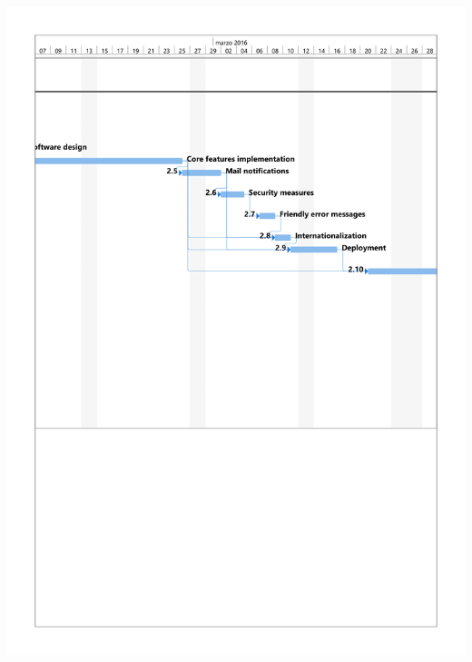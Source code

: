 \documentclass{DeustoFDP}
\begin{document}
\begin{center}
	\includegraphics[width=1\linewidth]{fig/g3}
\end{center}
\end{document}
